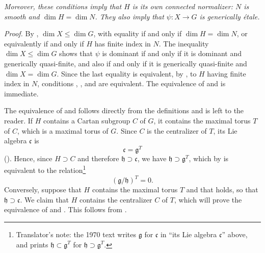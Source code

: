 \textit{Moreover, these conditions imply that \(H\) is its own
connected normalizer: \(N\) is smooth and
\(\dim H=\dim N\). They also imply that \(\psi:X\to G\) is
generically étale.}

\noindent\textit{Proof.}
By , \(\dim X\leq\dim G\), with equality if and only if
\(\dim H=\dim N\), or equivalently if and only if \(H\) has finite
index in \(N\). The inequality \(\dim X\leq\dim G\) shows that
\(\psi\) is dominant if and only if it is dominant and generically
quasi-finite, and also if and only if it is generically quasi-finite
and \(\dim X=\dim G\). Since the last equality is equivalent, by
, to \(H\) having finite index in \(N\), conditions , , and
 are equivalent. The equivalence of  and  is
immediate.

The equivalence of  and  follows directly from the
definitions and is left to the reader. If \(H\) contains a Cartan
subgroup \(C\) of \(G\), it contains the maximal torus \(T\) of
\(C\), which is a maximal torus of \(G\). Since \(C\) is the
centralizer of \(T\), its Lie algebra \(\mathfrak c\) is
\[
  \mathfrak c=\mathfrak g^T
\]
(). Hence, since
\(H\supset C\) and therefore \(\mathfrak h\supset\mathfrak c\), we have
\(\mathfrak h\supset\mathfrak g^T\), which by  is equivalent to
the relation\footnote{Translator's note: the 1970 text writes \(\mathfrak g\) for
\(\mathfrak c\) in ``its Lie algebra \(\mathfrak c\)'' above, and prints
\(\mathfrak h\subset\mathfrak g^T\) for
\(\mathfrak h\supset\mathfrak g^T\).}
\[
\tag{x}
  (\mathfrak g/\mathfrak h)^T=0.
\]
Conversely, suppose that \(H\) contains the maximal torus \(T\) and
that  holds, so that \(\mathfrak h\supset\mathfrak c\). We claim
that \(H\) contains the centralizer \(C\) of \(T\), which will prove
the equivalence of  and . This follows from .

